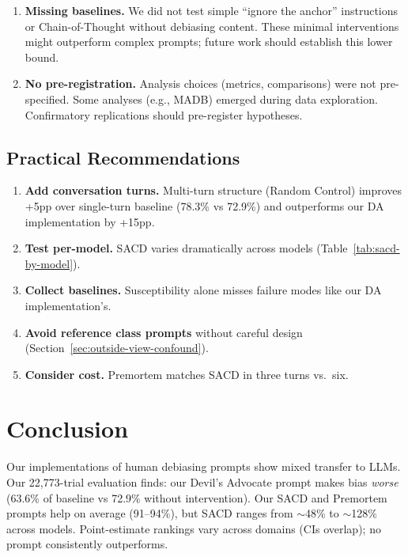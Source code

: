 \documentclass[11pt]{article}
\begin{document}
\begin{enumerate}
    \item \textbf{Missing baselines.} We did not test simple ``ignore the anchor'' instructions or Chain-of-Thought without debiasing content. These minimal interventions might outperform complex prompts; future work should establish this lower bound.
    
    \item \textbf{No pre-registration.} Analysis choices (metrics, comparisons) were not pre-specified. Some analyses (e.g., MADB) emerged during data exploration. Confirmatory replications should pre-register hypotheses.
\end{enumerate}

\subsection{Practical Recommendations}

\begin{enumerate}
    \item \textbf{Add conversation turns.} Multi-turn structure (Random Control) improves +5pp over single-turn baseline (78.3\% vs 72.9\%) and outperforms our DA implementation by +15pp.
    \item \textbf{Test per-model.} SACD varies dramatically across models (Table~\ref{tab:sacd-by-model}).
    \item \textbf{Collect baselines.} Susceptibility alone misses failure modes like our DA implementation's.
    \item \textbf{Avoid reference class prompts} without careful design (Section~\ref{sec:outside-view-confound}).
    \item \textbf{Consider cost.} Premortem matches SACD in three turns vs.\ six.
\end{enumerate}

\section{Conclusion}

Our implementations of human debiasing prompts show mixed transfer to LLMs. Our 22,773-trial evaluation finds: our Devil's Advocate prompt makes bias \textit{worse} (63.6\% of baseline vs 72.9\% without intervention). Our SACD and Premortem prompts help on average (91--94\%), but SACD ranges from $\sim$48\% to $\sim$128\% across models. Point-estimate rankings vary across domains (CIs overlap); no prompt consistently outperforms.
\end{document}
